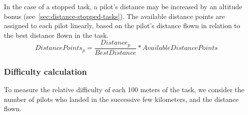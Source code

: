 \documentclass{article}
\begin{document}
\begin{pg}
In the case of a stopped task, a pilot’s distance may be increased by an
altitude bonus (see~\ref{sec:distance-stopped-tasks}). The available distance
points are assigned to each pilot linearly, based on the pilot’s distance flown
in relation to the best distance flown in the task.
\[ DistancePoints_p = \frac{Distance_p}{BestDistance} * AvailableDistancePoints \]
\end{pg}

\subsubsection{Difficulty calculation}
\label{sec:difficulty-calculation}
\begin{hg}
To measure the relative difficulty of each 100 meters of the task, we consider
the number of pilots who landed in the successive few kilometers, and the
distance flown.


\end{hg}
\end{document}
